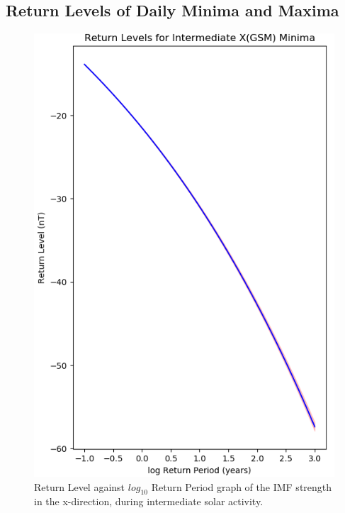 \documentclass[12pt]{article}
\begin{document}
    \subsection{Return Levels of Daily Minima and Maxima}\label{sec:returnperiod}
        \begin{figure}[t!]
            \begin{minipage}{0.48\textwidth}
                \centering
                \includegraphics[width=\textwidth]{fig_method/MFIintXminReturn.png}
                \caption{Return Level against $log_{10}$ Return Period graph of the IMF strength in the x-direction, during intermediate solar activity.}
                \label{fig:MFIintXminReturn}
            \end{minipage}
            \hfill
            \begin{minipage}{0.48\textwidth}

\end{minipage}
\end{figure}
\end{document}
